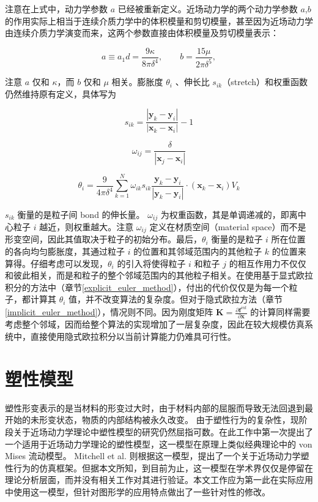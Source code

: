 注意在上式中，动力学参数 $a$ 已经被重新定义。近场动力学的两个动力学参数 $a$,$b$ 的作用实际上相当于连续介质力学中的体积模量和剪切模量，甚至因为近场动力学由连续介质力学演变而来，这两个参数直接由体积模量及剪切模量表示：

\begin{equation}
a \equiv a_1d = \frac{9\kappa}{8\pi\delta^4} ,\qquad b = \frac{15\mu}{2\pi\delta^5},
\end{equation}

注意 $a$ 仅和 $\kappa$，而 $b$ 仅和 $\mu$ 相关。膨胀度 $\theta_i$ 、伸长比 $s_{ik}$（stretch）和权重函数仍然维持原有定义，具体写为

\begin{equation}
s_{ik}=\frac{|\mathbf{y}_k-\mathbf{y}_i|}{|\mathbf{x}_k-\mathbf{x}_i|} -1
\end{equation}

\begin{equation}
\omega_{ij} = \frac{\delta}{|\mathbf{x}_j-\mathbf{x}_i|}
\end{equation}

\begin{equation}
\theta_i = \frac{9}{4\pi\delta^4}\sum_{k=1}^N\omega_{ik}s_{ik}\frac{\mathbf{y}_k-\mathbf{y}_i}{|\mathbf{y}_k-\mathbf{y}_i|}\cdot(\mathbf{x}_k-\mathbf{x}_i)V_k
\end{equation}

$s_{ik}$ 衡量的是粒子间 bond 的伸长量。 $\omega_{ij}$ 为权重函数，其是单调递减的，即离中心粒子 $i$ 越近，则权重越大。注意 $\omega_{ij}$ 定义在材质空间（material space）而不是形变空间，因此其值取决于粒子的初始分布。最后，$\theta_i$ 衡量的是粒子 $i$ 所在位置的各向均匀膨胀度，其通过粒子 $i$ 的位置和其邻域范围内的其他粒子 $k$ 的位置来算得。仔细考虑可以发现，$\theta_i$ 的引入将使得粒子 $i$ 和粒子 $j$ 的相互作用力不仅仅和彼此相关，而是和粒子的整个邻域范围内的其他粒子相关。在使用基于显式欧拉积分的方法中（章节\ref{explicit_euler_method}），付出的代价仅仅是为每一个粒子，都计算其 $\theta_i$ 值，并不改变算法的复杂度。但对于隐式欧拉方法（章节\ref{implicit_euler_method}），情况则不同。因为刚度矩阵 $\textbf{K} = \frac{\partial \textbf{f}^{int}}{\partial \textbf{x}}$ 的计算同样需要考虑整个邻域，因而给整个算法的实现增加了一层复杂度，因此在较大规模仿真系统中，直接使用隐式欧拉积分以当前计算能力仍难具可行性。

\section{塑性模型}
塑性形变表示的是当材料的形变过大时，由于材料内部的屈服而导致无法回退到最开始的未形变状态，物质的内部结构被永久改变。
由于塑性行为的复杂性，现阶段关于近场动力学理论中塑性模型的研究仍然屈指可数。在此工作中第一次提出了一个适用于近场动力学理论的塑性模型，这一模型在原理上类似经典理论中的 von Mises 流动模型。 Mitchell et al. 则根据这一模型，提出了一个关于近场动力学塑性行为的仿真框架。但据本文所知，到目前为止，这一模型在学术界仅仅是停留在理论分析层面，而并没有相关工作对其进行验证。本文工作应为第一此在实际应用中使用这一模型，但针对图形学的应用特点做出了一些针对性的修改。

